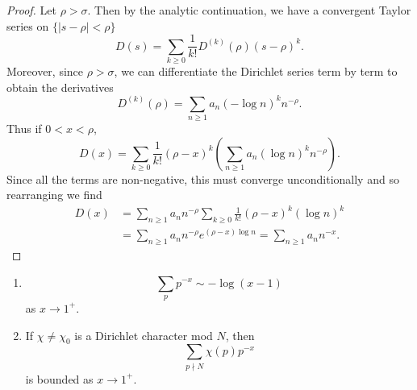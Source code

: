 \documentclass{memoir}
\begin{document}
\begin{proof}
    Let $\rho > \sigma$. Then by the analytic continuation, we have a convergent Taylor series on $\{|s-\rho| < \rho\}$
    \begin{equation}
        D(s) = \sum_{k\ge 0} \frac1{k!}D^{(k)}(\rho)(s-\rho)^k.
    \end{equation}
    Moreover, since $\rho > \sigma$, we can differentiate the Dirichlet series term by term to obtain the derivatives
    \begin{equation}
        D^{(k)}(\rho) = \sum_{n\ge 1} a_n(-\log n)^kn^{-\rho}.
    \end{equation}
    Thus if $0<x<\rho$,
    \begin{equation}
        D(x) = \sum_{k\ge 0}\frac1{k!}(\rho-x)^k\left(\sum_{n\ge 1}a_n(\log n)^kn^{-\rho}\right).
    \end{equation}
    Since all the terms are non-negative, this must converge unconditionally and so rearranging we find
    \begin{align}
        D(x) &= \sum_{n\ge 1}a_nn^{-\rho}\sum_{k\ge 0}\frac1{k!}(\rho-x)^k(\log n)^k \nonumber \\
             &= \sum_{n\ge 1} a_nn^{-\rho}e^{(\rho-x)\log n} = \sum_{n\ge 1}a_nn^{-x}.
    \end{align}
\end{proof}
\begin{lemma}
    \label{lem:div}
    \begin{enumerate}
        \item 
        \begin{equation}
            \sum_{p}p^{-x} \sim -\log(x-1)
        \end{equation}
        as $x\to 1^+$.
        \item
        If $\chi \ne \chi_0$ is a Dirichlet character mod $N$, then
        \begin{equation}
            \sum_{p\nmid N}\chi(p)p^{-x}
        \end{equation}
        is bounded as $x\to 1^+$.
    \end{enumerate}
\end{lemma}
\end{document}
